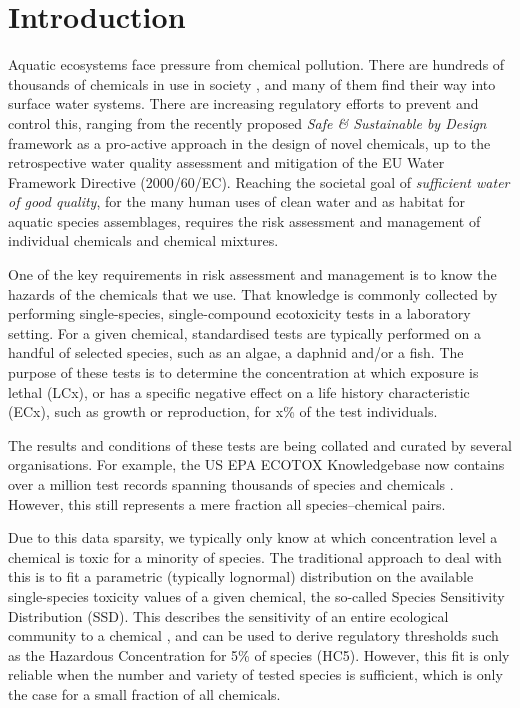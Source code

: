 \section{Introduction}

Aquatic ecosystems face pressure from chemical pollution. There are hundreds of thousands of chemicals in use in society \cite{wang2020toward}, and many of them find their way into surface water systems. There are increasing regulatory efforts to prevent and control this, ranging from the recently proposed \textit{Safe \& Sustainable by Design} \cite{caldeira2022safe} framework as a pro-active approach in the design of novel chemicals, up to the retrospective water quality assessment and mitigation of the EU Water Framework Directive (2000/60/EC). Reaching the societal goal of \textit{sufficient water of good quality}, for the many human uses of clean water and as habitat for aquatic species assemblages, requires the risk assessment and management of individual chemicals and chemical mixtures.

One of the key requirements in risk assessment and management is to know the hazards of the chemicals that we use. That knowledge is commonly collected by performing single-species, single-compound ecotoxicity tests in a laboratory setting. For a given chemical, standardised tests are typically performed on a handful of selected species, such as an algae, a daphnid and/or a fish. The purpose of these tests is to determine the concentration at which exposure is lethal (LCx), or has a specific negative effect on a life history characteristic (ECx), such as growth or reproduction, for x\% of the test individuals.

The results and conditions of these tests are being collated and curated by several organisations. For example, the US EPA ECOTOX Knowledgebase now contains over a million test records spanning thousands of species and chemicals \cite{ECOTOX}. However, this still represents a mere fraction all species--chemical pairs.

Due to this data sparsity, we typically only know at which concentration level a chemical is toxic for a minority of species. The traditional approach to deal with this is to fit a parametric (typically lognormal) distribution on the available single-species toxicity values of a given chemical, the so-called Species Sensitivity Distribution (SSD). This describes the sensitivity of an entire ecological community to a chemical \cite{posthuma2001species}, and can be used to derive regulatory thresholds such as the Hazardous Concentration for 5\% of species (HC5). However, this fit is only reliable when the number and variety of tested species is sufficient, which is only the case for a small fraction of all chemicals.

